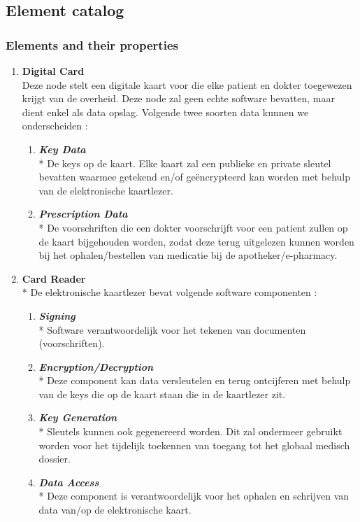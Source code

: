 \documentclass[a4paper,10pt]{article}
\begin{document}
\subsection{Element catalog}

\subsubsection*{Elements and their properties}

\begin{enumerate}
 \item \textbf{Digital Card}\\
Deze node stelt een digitale kaart voor die elke patient en dokter toegewezen krijgt van de overheid. Deze node zal geen echte software bevatten, maar dient enkel als data opslag. Volgende twee soorten data kunnen we onderscheiden :
\begin{enumerate}
 \item \textit{\textbf{Key Data}}\\*
De keys op de kaart. Elke kaart zal een publieke en private sleutel bevatten waarmee getekend en/of geëncrypteerd kan worden met behulp van de elektronische kaartlezer.
\item \textit{\textbf{Prescription Data}}\\*
De voorschriften die een dokter voorschrijft voor een patient zullen op de kaart bijgehouden worden, zodat deze terug uitgelezen kunnen worden bij het ophalen/bestellen van medicatie bij de apotheker/e-pharmacy.
\end{enumerate}

\item \textbf{Card Reader}\\*
De elektronische kaartlezer bevat volgende software componenten : 
\begin{enumerate}
\item \textit{\textbf{Signing}}\\*
Software verantwoordelijk voor het tekenen van documenten (voorschriften).
\item \textit{\textbf{Encryption/Decryption}}\\*
Deze component kan data versleutelen en terug ontcijferen met behulp van de keys die op de kaart staan die in de kaartlezer zit.
\item \textit{\textbf{Key Generation}}\\*
Sleutels kunnen ook gegenereerd worden. Dit zal ondermeer gebruikt worden voor het tijdelijk toekennen van toegang tot het globaal medisch dossier.
\item \textit{\textbf{Data Access}}\\*
Deze component is verantwoordelijk voor het ophalen en schrijven van data van/op de elektronische kaart.
\end{enumerate}


\end{enumerate}
\end{document}
